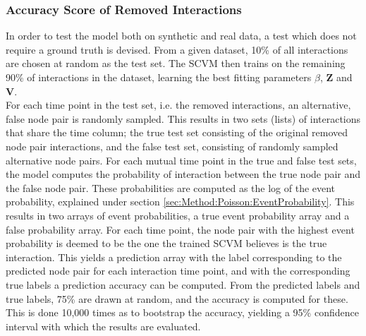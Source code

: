 \subsubsection{Accuracy Score of Removed Interactions}
\label{sec:Method:Evaluation:AUC}
In order to test the model both on synthetic and real data, a test which does not require a ground truth is devised.
From a given dataset, 10\% of all interactions are chosen at random as the test set.
The SCVM then trains on the remaining 90\% of interactions in the dataset, learning the best fitting parameters $\beta$, $\textbf{Z}$ and $\textbf{V}$.
\\
For each time point in the test set, i.e. the removed interactions, an alternative, false node pair is randomly sampled.
This results in two sets (lists) of interactions that share the time column; the true test set consisting of the original removed node pair interactions, and the false test set, consisting of randomly sampled alternative node pairs.
For each mutual time point in the true and false test sets, the model computes the probability of interaction between the true node pair and the false node pair.
These probabilities are computed as the log of the event probability, explained under section \ref{sec:Method:Poisson:EventProbability}.
This results in two arrays of event probabilities, a true event probability array and a false probability array.
For each time point, the node pair with the highest event probability is deemed to be the one the trained SCVM believes is the true interaction.
This yields a prediction array with the label corresponding to the predicted node pair for each interaction time point, and with the corresponding true labels a prediction accuracy can be computed.
From the predicted labels and true labels, 75\% are drawn at random, and the accuracy is computed for these.
This is done 10,000 times as to bootstrap the accuracy, yielding a 95\% confidence interval with which the results are evaluated.